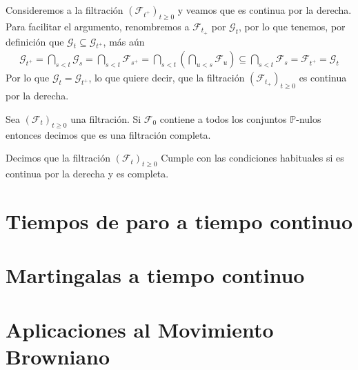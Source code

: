 Consideremos a la filtración $(\mathcal{F}_{t^{+}})_{t \geq 0}$ y veamos que es continua por la derecha. Para facilitar el argumento, renombremos a $\mathcal{F}_{t_{+}}$ por $\mathcal{G}_t$, por lo que tenemos, por definición que $\mathcal{G}_t \subseteq \mathcal{G}_{t^{+}}$, más aún
	\begin{align*}
	\mathcal{G}_{t^{+}} = \bigcap_{s < t} \mathcal{G}_s = \bigcap_{s < t} \mathcal{F}_{s^{+}} = \bigcap_{s < t}  \left( \bigcap_{u < s} \mathcal{F}_u \right) \subseteq \bigcap_{s < t} \mathcal{F}_s = \mathcal{F}_{t^{+}} = \mathcal{G}_t
	\end{align*}
Por lo que $\mathcal{G}_t  = \mathcal{G}_{t^{+}}$, lo que quiere decir, que la filtración $(\mathcal{F}_{t_{+}})_{t \geq 0}$ es continua por la derecha. \\

\begin{definition}
	Sea $(\mathcal{F}_t )_{t \geq 0}$ una filtración. Si $\mathcal{F}_0$ contiene a todos los conjuntos $\mathbb{P}$-nulos entonces decimos que es una filtración completa.
\end{definition}

\begin{definition}
	Decimos que la filtración $(\mathcal{F}_t )_{t \geq 0}$ Cumple con las condiciones habituales si es continua por la derecha y es completa.
\end{definition}

\section{Tiempos de paro a tiempo continuo}
\section{Martingalas a tiempo continuo}
\section{Aplicaciones al Movimiento Browniano}